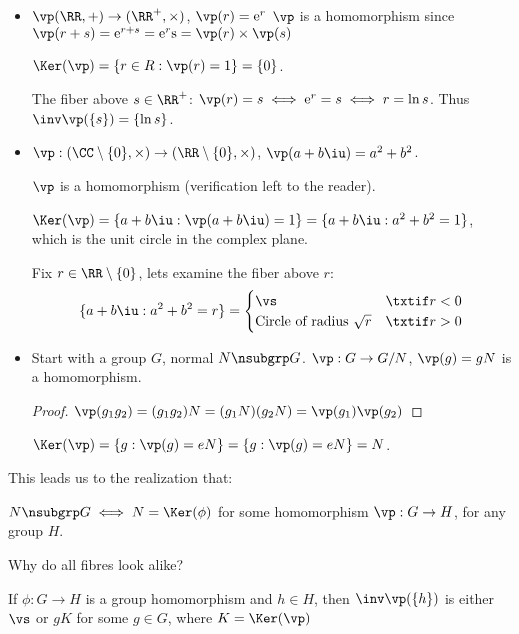 \documentclass[notes.tex]{subfiles}
\begin{document}
\begin{eg}\leavevmode
\begin{itemize}
	\item $\vp(\RR, +)\to(\RR^+, \times)$, $\vp(r) = \mathrm{e}^r$
	$\vp$ is a homomorphism since $\vp(r+s) = \mathrm{e}^{r+s} = \mathrm{e}^r\mathrm{s} = \vp(r)\times \vp(s)$

	$\Ker(\vp) = \{r\in R : \vp(r) = 1\} = \{0\}$.

	The fiber above $s\in \RR^+$: 
		$\vp(r) = s \iff \mathrm{e}^r=s \iff r = \ln s$. Thus $\inv\vp(\{s\}) = \{\ln s\}$.

	\item $\vp:(\CC\setminus\{0\}, \times)\to(\RR\setminus\{0\}, \times)$,
		$\vp(a+b\iu) = a^2 + b^2$.

		$\vp$ is a homomorphism (verification left to the reader).

		$\Ker(\vp) = \{a+b\iu : \vp(a+b\iu) = 1\} = \{a+b\iu : a^2 + b^2 = 1\}$,
		which is the unit circle in the complex plane.

		Fix $r\in\RR\setminus\{0\}$, lets examine the fiber above $r$:
		\[
		\{a+b\iu : a^2 + b^2 = r\} = 
		\begin{cases}
			\vs &\txtif r < 0\\
			\text{Circle of radius }\sqrt{r}&\txtif r > 0
		\end{cases}
		\]
	\item Start with a group $G$, normal $N\nsubgrp G$.
		$\vp:G\to G/N$, $\vp(g) = gN$ is a homomorphism.

		\begin{proof}
			$\vp(g_1g_2) = (g_1g_2)N = (g_1N)(g_2N) = \vp(g_1)\vp(g_2)$
		\end{proof}

		$\Ker(\vp) = \{g:\vp(g) = eN\} = \{g:\vp(g) = eN\} = N$.
\end{itemize} 
\end{eg}

This leads us to the realization that:
\begin{proposition}
	$N\nsubgrp G \iff N = \Ker(\phi)$
	for some homomorphism $\vp:G\to H$, for any group $H$.
\end{proposition}

Why do all fibres look alike?

\begin{proposition}
	If $\phi:G\to H$ is a group homomorphism and $h\in H$,
	then $\inv\vp(\{h\})$ is either $\vs$ or $gK$ for some $g\in G$, where $K = \Ker(\vp)$
\end{proposition}
\end{document}
